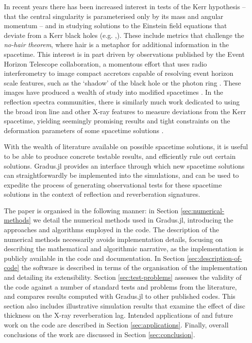 \documentclass[fleqn,usenatbib]{mnras}
\newcommand{\Gradus}{Gradus.jl\xspace}
\begin{document}
In recent years there has been increased interest in tests of the Kerr
hypothesis -- that the central singularity is parameterised only by its mass and
angular momentum -- and in studying solutions to the Einstein field equations
that deviate from a Kerr black holes (e.g. \citealt{johannsen_testing_2010,
chrusciel_stationary_2012, bambi_testing_2022, patra_accretion_2023,
chen_observational_2024},). These include metrics that challenge the
\textit{no-hair theorem}, where hair is a metaphor for additional information in
the spacetime. This interest is in part driven by observations published by the
Event Horizon Telescope collaboration, a momentous effort that uses radio
interferometry to image compact accretors capable of resolving event horizon
scale features, such as the `shadow' of the black hole or the photon ring
\citep{the_event_horizon_telescope_collaboration_first_2019,
the_event_horizon_telescope_collaboration_first_2023}. These images have
produced a wealth of study into modified spacetimes
\citep[e.g.][]{eht_non_kerr_2022}. In the reflection spectra communities, there
is similarly much work dedicated to using the broad iron line and other X-ray
features to measure deviations from the Kerr spacetime, yielding seemingly
promising results and tight constraints on the deformation parameters of some
spacetime solutions \citep[e.g.][]{bambi_precision_measuremets_2021}.

With the wealth of literature available on possible spacetime solutions, it is
useful to be able to produce concrete testable results, and efficiently rule out
certain solutions. \Gradus provides an interface through which new spacetime
solutions can straightforwardly be implemented into the simulations, and can be
used to expedite the process of generating observational tests for these
spacetime solutions in the context of reflection and reverberation signatures.

The paper is organised in the following manner: in Section
\ref{sec:numerical-methods} we detail the numerical methods used in \Gradus,
introducing the approaches and algorithms employed in the code. The description
of the numerical methods necessarily avoids implementation details, focusing on
describing the mathematical and algorithmic narrative, as the implementation is
publicly available in the code and documentation. In Section
\ref{sec:description-of-code} the software is described in terms of the
organisation of the implementation and detailing its extensibility. Section
\ref{sec:test-problems} assesses the validity of the code against a number of
standard tests and problems from the literature, and compares results computed
with \Gradus to other published codes. This section also includes illustrative
simulation results that examine the effect of disc thickness on the X-ray
reverberation lag. Intended applications of and future work on the code are
described in Section \ref{sec:applications}. Finally, overall conclusions of the
work are discussed in Section \ref{sec:conclusion}.
\end{document}
